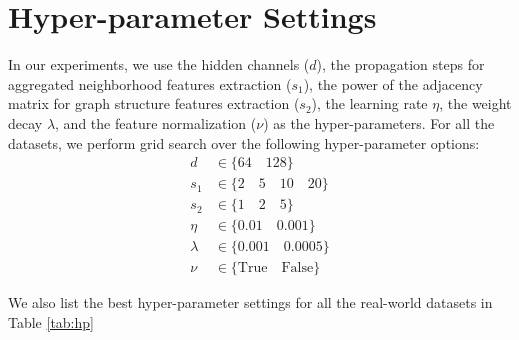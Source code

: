 \documentclass{article}
\theoremstyle{plain}
\begin{document}
\section{Hyper-parameter Settings} \label{sec:hps}
\label{app:hyperparameter}
In our experiments, we use the hidden channels ($d$), the propagation steps for aggregated neighborhood features extraction ($s_1$), the power of the adjacency matrix for graph structure features extraction ($s_2$), the learning rate $\eta$, the weight decay $\lambda$, and the feature normalization ($\nu$) as the hyper-parameters. For all the datasets, we perform grid search over the following hyper-parameter options:
\begin{align*} \label{eq:mplayer}
  d &\in \{64 \quad 128 \} \\
  s_1 &\in \{2 \quad 5 \quad 10 \quad 20 \} \\
  s_2 &\in \{1 \quad 2 \quad 5 \} \\
  \eta &\in \{0.01 \quad 0.001 \} \\
  \lambda &\in \{0.001 \quad 0.0005 \} \\
  \nu &\in \{\text{True} \quad \text{False} \}
\end{align*}

We also list the best hyper-parameter settings for all the real-world datasets in Table \ref{tab:hp}
\end{document}
